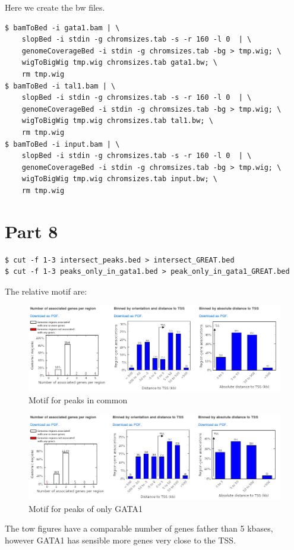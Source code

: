 \documentclass[11pt]{article} %
\begin{document}
Here we create the bw files.

\begin{lstlisting}
$ bamToBed -i gata1.bam | \
    slopBed -i stdin -g chromsizes.tab -s -r 160 -l 0  | \
    genomeCoverageBed -i stdin -g chromsizes.tab -bg > tmp.wig; \
    wigToBigWig tmp.wig chromsizes.tab gata1.bw; \
    rm tmp.wig
$ bamToBed -i tal1.bam | \
    slopBed -i stdin -g chromsizes.tab -s -r 160 -l 0  | \
    genomeCoverageBed -i stdin -g chromsizes.tab -bg > tmp.wig; \
    wigToBigWig tmp.wig chromsizes.tab tal1.bw; \
    rm tmp.wig
$ bamToBed -i input.bam | \
    slopBed -i stdin -g chromsizes.tab -s -r 160 -l 0  | \
    genomeCoverageBed -i stdin -g chromsizes.tab -bg > tmp.wig; \
    wigToBigWig tmp.wig chromsizes.tab input.bw; \
    rm tmp.wig
\end{lstlisting}

\section{Part 8}

\begin{lstlisting}
$ cut -f 1-3 intersect_peaks.bed > intersect_GREAT.bed
$ cut -f 1-3 peaks_only_in_gata1.bed > peak_only_in_gata1_GREAT.bed
\end{lstlisting}

The relative motif are:

\begin{figure}[h]
	\caption{Motif for peaks in common}
	\includegraphics[width=\textwidth]{common}
\end{figure}


\begin{figure}[h]
	\caption{Motif for peaks of only GATA1}
	\includegraphics[width=\textwidth]{only_gata1}
\end{figure}


The tow figures have a comparable number of genes father than 5 kbases, however GATA1 has sensible more genes very close to the TSS.
\end{document}
